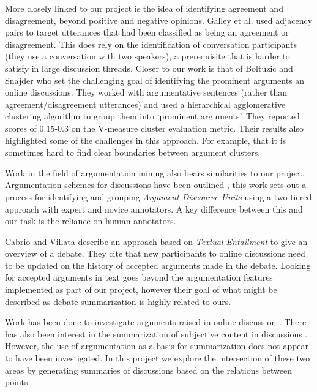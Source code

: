     More closely linked to our project is the idea of identifying agreement and disagreement, beyond positive and negative opinions. Galley et al. \cite{galley2004identifying} used adjacency pairs to target utterances that had been classified as being an agreement or disagreement. This does rely on the identification of conversation participants (they use a conversation with two speakers), a prerequisite that is harder to satisfy in large discussion threads. Closer to our work is that of Boltuzic and Snajder \cite{boltuzic2015identifying} who set the challenging goal of identifying the prominent arguments an online discussions. They worked with argumentative sentences (rather than agreement/disagreement utterances) and used a hierarchical agglomerative clustering algorithm to group them into `prominent arguments'. They reported scores of 0.15-0.3 on the V-measure cluster evaluation metric. Their results also highlighted some of the challenges in this approach. For example, that it is sometimes hard to find clear boundaries between argument clusters.

    Work in the field of argumentation mining also bears similarities to our project. Argumentation schemes for discussions have been outlined \cite{ghosh2014analyzing}, this work sets out a process for identifying and grouping \textit{Argument Discourse Units} using a two-tiered approach with expert and novice annotators. A key difference between this and our task is the reliance on human annotators.

    Cabrio and Villata \cite{cabrio2012combining} describe an approach based on \textit{Textual Entailment} to give an overview of a debate. They cite that new participants to online discussions need to be updated on the history of accepted arguments made in the debate. Looking for accepted arguments in text goes beyond the argumentation features implemented as part of our project, however their goal of what might be described as debate summarization is highly related to ours.

    Work has been done to investigate arguments raised in online discussion \cite{boltuzic2015identifying,cabrio2012combining,ghosh2014analyzing}. There has also been interest in the summarization of subjective content in discussions \cite{hu2004mining,lloret2009towards,galley2004identifying}. However, the use of argumentation as a basis for summarization does not appear to have been investigated. In this project we explore the intersection of these two areas by generating summaries of discussions based on the relations between points.
